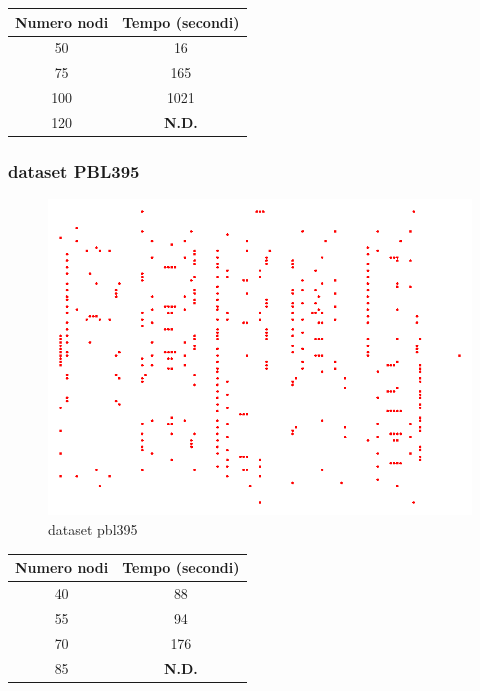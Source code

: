 \documentclass{article}
\begin{document}
\begin{table}[h]
\centering
\begin{tabular}{c | c}
\hline \hline
\textbf{Numero nodi} & \textbf{Tempo (secondi)} \\
\hline
50 & 16 \\
\hline
75 & 165 \\
\hline
100 & 1021 \\
\hline
120 & \textbf{N.D.} \\
\hline
\end{tabular}
\end{table}

\newpage
\subsubsection{dataset PBL395}

\begin{figure}[h!]
\begin{center}
\includegraphics[scale=0.5]{img/pbl395.png} %
\caption{dataset pbl395}
\end{center}
\end{figure}

\begin{table}[h]
\centering
\begin{tabular}{c | c}
\hline \hline
\textbf{Numero nodi} & \textbf{Tempo (secondi)} \\
\hline
40 & 88 \\
\hline
55 & 94 \\
\hline
70 & 176 \\
\hline
85 & \textbf{N.D.} \\
\hline
\end{tabular}
\end{table}
\end{document}
